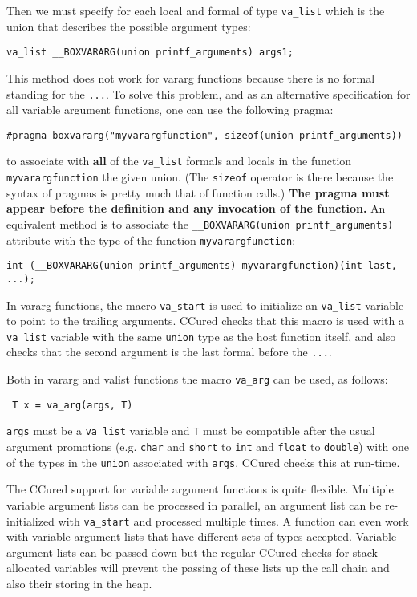 \documentclass{book}
\def\t#1{{\tt #1}}
\begin{document}
 Then we must specify for each local and formal of type \t{va\_list} which is
the union that describes the possible argument types: 
\begin{verbatim}
va_list __BOXVARARG(union printf_arguments) args1;
\end{verbatim}

 This method does not work for vararg functions because there is no formal
standing for the \t{...}. To solve this problem, and as an alternative
specification for all variable argument functions, one can use the following
pragma:
\begin{verbatim}
#pragma boxvararg("myvarargfunction", sizeof(union printf_arguments))
\end{verbatim}

 to associate with {\bf all} of the \t{va\_list} formals and locals in the
function \t{myvarargfunction} the given union. (The \t{sizeof} operator is
there because the syntax of pragmas is pretty much that of function calls.)
{\bf The pragma must appear before the definition and any invocation of the
function.} An equivalent method is to associate the \t{\_\_BOXVARARG(union
printf\_arguments)} attribute with the type of the function
\t{myvarargfunction}:
\begin{verbatim}
int (__BOXVARARG(union printf_arguments) myvarargfunction)(int last, ...);
\end{verbatim}

 In vararg functions, the macro \t{va\_start} is used to initialize an
\t{va\_list} variable to point to the trailing arguments. CCured checks that
this macro is used with a \t{va\_list} variable with the same \t{union} type
as the host function itself, and also checks that the second argument is the
last formal before the \t{...}. 

 Both in vararg and valist functions the macro \t{va\_arg} can be used, as
 follows: 
\begin{verbatim}
 T x = va_arg(args, T)
\end{verbatim}

 \t{args} must be a \t{va\_list} variable and \t{T} must be compatible after
the usual argument promotions (e.g. \t{char} and \t{short} to \t{int} and
\t{float} to \t{double}) with one of the types in the \t{union} associated
with \t{args}. CCured checks this at run-time. 

 The CCured support for variable argument functions is quite flexible.
Multiple variable argument lists can be processed in parallel, an argument
list can be re-initialized with \t{va\_start} and processed multiple times. A
function can even work with variable argument lists that have different sets
of types accepted. Variable argument lists can be passed down but the regular
CCured checks for stack allocated variables will prevent the passing of these
lists up the call chain and also their storing in the heap.
\end{document}
